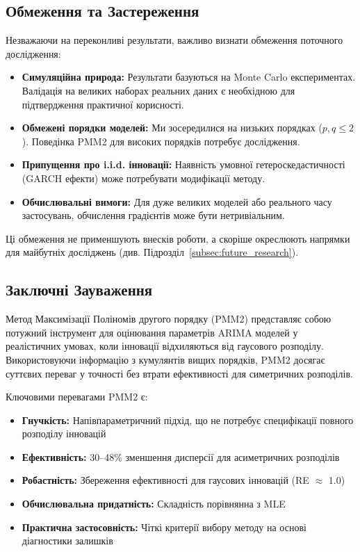 \documentclass[12pt,a4paper]{article}
\begin{document}
\subsection{Обмеження та Застереження}
\label{subsec:caveats}

Незважаючи на переконливі результати, важливо визнати обмеження поточного дослідження:

\begin{itemize}
    \item \textbf{Симуляційна природа:} Результати базуються на Monte Carlo експериментах. Валідація на великих наборах реальних даних є необхідною для підтвердження практичної корисності.

    \item \textbf{Обмежені порядки моделей:} Ми зосередилися на низьких порядках ($p, q \leq 2$). Поведінка PMM2 для високих порядків потребує дослідження.

    \item \textbf{Припущення про i.i.d. інновації:} Наявність умовної гетероскедастичності (GARCH ефекти) може потребувати модифікації методу.

    \item \textbf{Обчислювальні вимоги:} Для дуже великих моделей або реального часу застосувань, обчислення градієнтів може бути нетривіальним.
\end{itemize}

Ці обмеження не применшують внесків роботи, а скоріше окреслюють напрямки для майбутніх досліджень (див. Підрозділ~\ref{subsec:future_research}).

\subsection{Заключні Зауваження}
\label{subsec:final_remarks}

Метод Максимізації Поліномів другого порядку (PMM2) представляє собою потужний інструмент для оцінювання параметрів ARIMA моделей у реалістичних умовах, коли інновації відхиляються від гаусового розподілу. Використовуючи інформацію з кумулянтів вищих порядків, PMM2 досягає суттєвих переваг у точності без втрати ефективності для симетричних розподілів.

Ключовими перевагами PMM2 є:
\begin{itemize}
    \item \textbf{Гнучкість:} Напівпараметричний підхід, що не потребує специфікації повного розподілу інновацій
    \item \textbf{Ефективність:} 30--48\% зменшення дисперсії для асиметричних розподілів
    \item \textbf{Робастність:} Збереження ефективності для гаусових інновацій (RE $\approx$ 1.0)
    \item \textbf{Обчислювальна придатність:} Складність порівнянна з MLE
    \item \textbf{Практична застосовність:} Чіткі критерії вибору методу на основі діагностики залишків
\end{itemize}
\end{document}
